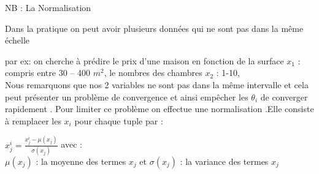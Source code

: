   
  NB :  La Normalisation
  
  Dans la pratique on peut avoir plusieurs données qui ne sont pas dans la même échelle
  
  par ex: on cherche à prédire le prix d'une maison en fonction de la surface ${x}_{1}$ : compris entre 30 -- 400 ${m}^2$, le nombres des chambres ${x}_{2}$ : 1-10,\\
    Nous remarquons que nos 2 variables ne sont pas dans la même intervalle et  cela peut présenter un problème de convergence et ainsi empêcher les ${\theta }_{i}$ de converger rapidement .
   Pour limiter ce problème on effectue une normalisation .Elle consiste à remplacer les ${x}_{i}$ pour chaque tuple par :
   
        ${x}_{j}^{i} =  \frac{{x}_{j}^{i}- {\mu({x}_{j})}}{{\sigma({x}_{j})}}$
        avec : \\
        ${\mu({x}_{j})}$ : la moyenne des termes  ${x}_{j}$ et 
        ${\sigma({x}_{j})}$ : la variance des termes  ${x}_{j}$ 
        